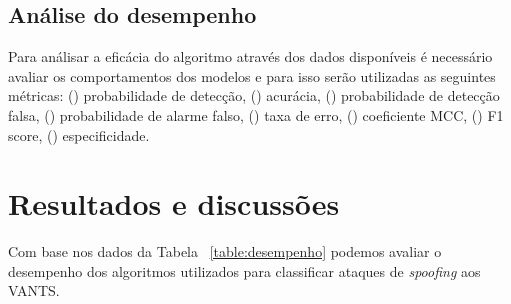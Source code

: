 \documentclass[12pt]{article}
\begin{document}
\subsection{Análise do desempenho}
Para análisar a eficácia do algoritmo através dos dados disponíveis é 
necessário avaliar os comportamentos dos modelos e para isso 
serão utilizadas as seguintes métricas:
() probabilidade de detecção,
() acurácia,
() probabilidade de detecção falsa,
() probabilidade de alarme falso,
() taxa de erro,
() coeficiente MCC,
() F1 score,
() especificidade.

\section{Resultados e discussões}

Com base nos dados da Tabela ~\ref{table:desempenho} podemos avaliar
o desempenho dos algoritmos utilizados
para classificar ataques de \textit{spoofing} aos VANTS.

\begin{table}[!h]
  \caption{Métricas de desempenho}
  \label{table:desempenho}
\end{table}
\end{document}
